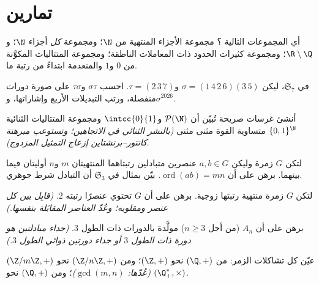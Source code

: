 \section{تمارين}

\begin{exercise}[$\star$]\label{exo:b2:structures:1}
أي المجموعات التالية ؟ مجموعة الأجزاء المنتهية
من $\N$؛ ومجموعة \emph{كل} أجزاء $\N$؛ و$\R \setminus \Q$؛
ومجموعة كثيرات الحدود ذات المعاملات الناطقة؛ ومجموعة
المتتاليات المكوَّنة من $0$ و$1$ والمنعدمة ابتداءً من رتبة ما.
\end{exercise}

\begin{exercise}[$\star$]\label{exo:b2:structures:2}
في $\mathfrak{S}_7$، ليكن $\sigma = (1\,4\,2\,6)(3\,5)$ و$\tau =
(2\,3\,7)$. احسب $\sigma\tau$ و$\tau\sigma$ على صورة دورات
منفصلة، ورتب التبديلات الأربع وإشاراتها، و$\sigma^{2026}$.
\end{exercise}

\begin{exercise}[$\star$]\label{exo:b2:structures:3}
أنشئ غرسات صريحة تُبيّن أن $\mathcal{P}(\N)$ و$\intcc{0}{1}$ ومجموعة المتتاليات
الثنائية $\{0,1\}^{\N}$ متساوية القوة مثنى مثنى \emph{(بالنشر الثنائي في
الاتجاهين؛ وتستوعب مبرهنة كانتور--برنشتاين إزعاج التمثيل المزدوج)}.
\end{exercise}

\begin{exercise}[$\star$]\label{exo:b2:structures:4}
لتكن $G$ زمرة وليكن $a, b \in G$ عنصرين متبادلين رتبتاهما المنتهيتان
$m$ و$n$ أوليتان فيما بينهما. برهن على أن $\operatorname{ord}(ab) =
mn$. بيّن بمثال في $\mathfrak{S}_3$ أن التبادل شرط جوهري.
\end{exercise}

\begin{exercise}[$\star\star$]\label{exo:b2:structures:5}
لتكن $G$ زمرة منتهية رتبتها زوجية. برهن على أن $G$ تحتوي
عنصرًا رتبته $2$. \emph{(قابِل بين كل عنصر ومقلوبه؛
وعُدّ العناصر المقابَلة بنفسها.)}
\end{exercise}

\begin{exercise}[$\star\star$]\label{exo:b2:structures:6}
برهن على أن $A_n$ (من أجل $n \geq 3$) مولَّدة بالدورات ذات الطول $3$.
\emph{(جداء مبادلتين هو دورة ذات الطول $3$ أو جداء دورتين ذواتَي
الطول $3$.)}
\end{exercise}

\begin{exercise}[$\star\star$]\label{exo:b2:structures:7}
عيّن كل تشاكلات الزمر: من $(\Q, +)$ نحو $(\Z, +)$؛ ومن
$(\Z/n\Z, +)$ نحو $(\Z/m\Z, +)$ \emph{(عُدّها:
$\gcd(m,n)$)}؛ ومن $(\Q, +)$ نحو $(\Q_+^*, \times)$.
\end{exercise}

